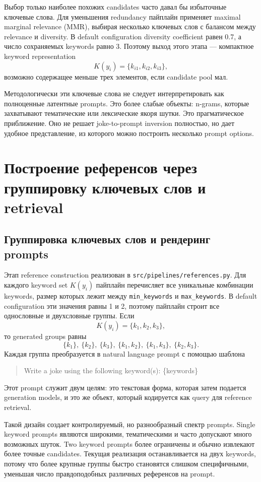 Выбор только наиболее похожих candidates часто давал бы избыточные ключевые слова. Для уменьшения redundancy пайплайн применяет maximal marginal relevance (MMR), выбирая несколько ключевых слов с балансом между relevance и diversity. В default configuration diversity coefficient равен 0.7, а число сохраняемых keywords равно \(3\). Поэтому выход этого этапа --- компактное keyword representation
\[
    K(y_i)=\{k_{i1},k_{i2},k_{i3}\},
\]
возможно содержащее меньше трех элементов, если candidate pool мал.

Методологически эти ключевые слова не следует интерпретировать как полноценные латентные prompts. Это более слабые объекты: n-grams, которые захватывают тематические или лексические якоря шутки. Это прагматическое приближение. Оно не решает joke-to-prompt inversion полностью, но дает удобное представление, из которого можно построить несколько prompt options.

\section{Построение референсов через группировку ключевых слов и retrieval}

\subsection{Группировка ключевых слов и рендеринг prompts}

Этап reference construction реализован в \texttt{src/pipelines/references.py}. Для каждого keyword set \(K(y_i)\) пайплайн перечисляет все уникальные комбинации keywords, размер которых лежит между \texttt{min\_keywords} и \texttt{max\_keywords}. В default configuration эти значения равны 1 и 2, поэтому пайплайн строит все однословные и двухсловные группы. Если
\[
    K(y_i)=\{k_1,k_2,k_3\},
\]
то generated groups равны
\[
    \{k_1\},\ \{k_2\},\ \{k_3\},\ \{k_1,k_2\},\ \{k_1,k_3\},\ \{k_2,k_3\}.
\]
Каждая группа преобразуется в natural language prompt с помощью шаблона
\begin{quote}
    \ttfamily
    Write a joke using the following keyword(s): \{keywords\}
\end{quote}
Этот prompt служит двум целям: это текстовая форма, которая затем подается generation models, и это же объект, который кодируется как query для reference retrieval.

Такой дизайн создает контролируемый, но разнообразный спектр prompts. Single keyword prompts являются широкими, тематическими и часто допускают много возможных шуток. Two keyword prompts более ограничены и обычно извлекают более точные candidates. Текущая реализация останавливается на двух keywords, потому что более крупные группы быстро становятся слишком специфичными, уменьшая число правдоподобных различных референсов на prompt.

